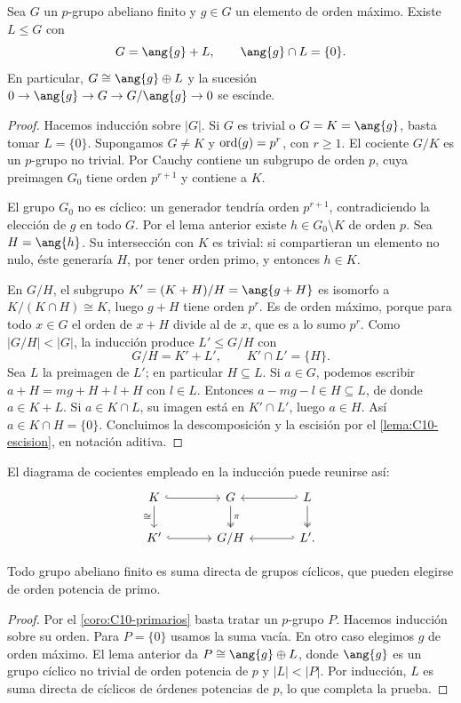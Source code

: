 \begin{lema}\label{lema:C10-factor-maximo}
Sea $G$ un $p$-grupo abeliano finito y $g\in G$ un elemento de orden máximo. Existe $L\le G$ con
\[
G=\ang{g}+L,\qquad \ang{g}\cap L=\{0\}.
\]
En particular, $G\cong\ang{g}\oplus L$ y la sucesión $0\to\ang{g}\to G\to G/\ang{g}\to0$ se escinde.
\end{lema}
\begin{proof}
Hacemos inducción sobre $|G|$. Si $G$ es trivial o $G=K=\ang{g}$, basta tomar $L=\{0\}$. Supongamos $G\ne K$ y $\operatorname{ord}(g)=p^r$, con $r\ge1$. El cociente $G/K$ es un $p$-grupo no trivial. Por Cauchy contiene un subgrupo de orden $p$, cuya preimagen $G_0$ tiene orden $p^{r+1}$ y contiene a $K$.

El grupo $G_0$ no es cíclico: un generador tendría orden $p^{r+1}$, contradiciendo la elección de $g$ en todo $G$. Por el lema anterior existe $h\in G_0\setminus K$ de orden $p$. Sea $H=\ang{h}$. Su intersección con $K$ es trivial: si compartieran un elemento no nulo, éste generaría $H$, por tener orden primo, y entonces $h\in K$.

En $G/H$, el subgrupo $K'=(K+H)/H=\ang{g+H}$ es isomorfo a $K/(K\cap H)\cong K$, luego $g+H$ tiene orden $p^r$. Es de orden máximo, porque para todo $x\in G$ el orden de $x+H$ divide al de $x$, que es a lo sumo $p^r$. Como $|G/H|<|G|$, la inducción produce $L'\le G/H$ con
\[
G/H=K'+L',\qquad K'\cap L'=\{H\}.
\]
Sea $L$ la preimagen de $L'$; en particular $H\subseteq L$. Si $a\in G$, podemos escribir $a+H=mg+H+l+H$ con $l\in L$. Entonces $a-mg-l\in H\subseteq L$, de donde $a\in K+L$. Si $a\in K\cap L$, su imagen está en $K'\cap L'$, luego $a\in H$. Así $a\in K\cap H=\{0\}$. Concluimos la descomposición y la escisión por el \cref{lema:C10-escision}, en notación aditiva.
\end{proof}
El diagrama de cocientes empleado en la inducción puede reunirse así:
\[
\begin{tikzcd}[column sep=large]
K \arrow[r,hook] \arrow[d,"\cong"'] & G \arrow[d,two heads,"\pi"] & L \arrow[l,hook'] \arrow[d,two heads] \\
K' \arrow[r,hook] & G/H & L' \arrow[l,hook'].
\end{tikzcd}
\]

\begin{coro}\label{coro:C10-existencia-ciclicos}
Todo grupo abeliano finito es suma directa de grupos cíclicos, que pueden elegirse de orden potencia de primo.
\end{coro}
\begin{proof}
Por el \cref{coro:C10-primarios} basta tratar un $p$-grupo $P$. Hacemos inducción sobre su orden. Para $P=\{0\}$ usamos la suma vacía. En otro caso elegimos $g$ de orden máximo. El lema anterior da $P\cong\ang{g}\oplus L$, donde $\ang{g}$ es un grupo cíclico no trivial de orden potencia de $p$ y $|L|<|P|$. Por inducción, $L$ es suma directa de cíclicos de órdenes potencias de $p$, lo que completa la prueba.
\end{proof}

